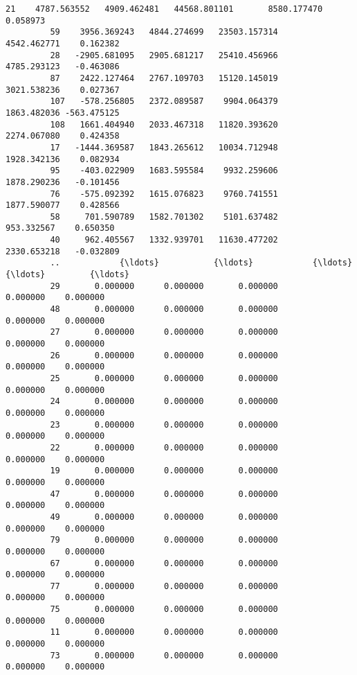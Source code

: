 \documentclass[11pt]{article}
\begin{document}
\begin{Verbatim}[commandchars=\\\{\}]
         21    4787.563552   4909.462481   44568.801101       8580.177470    0.058973   
         59    3956.369243   4844.274699   23503.157314       4542.462771    0.162382   
         28   -2905.681095   2905.681217   25410.456966       4785.293123   -0.463086   
         87    2422.127464   2767.109703   15120.145019       3021.538236    0.027367   
         107   -578.256805   2372.089587    9904.064379       1863.482036 -563.475125   
         108   1661.404940   2033.467318   11820.393620       2274.067080    0.424358   
         17   -1444.369587   1843.265612   10034.712948       1928.342136    0.082934   
         95    -403.022909   1683.595584    9932.259606       1878.290236   -0.101456   
         76    -575.092392   1615.076823    9760.741551       1877.590077    0.428566   
         58     701.590789   1582.701302    5101.637482        953.332567    0.650350   
         40     962.405567   1332.939701   11630.477202       2330.653218   -0.032809   
         ..            {\ldots}           {\ldots}            {\ldots}               {\ldots}         {\ldots}   
         29       0.000000      0.000000       0.000000          0.000000    0.000000   
         48       0.000000      0.000000       0.000000          0.000000    0.000000   
         27       0.000000      0.000000       0.000000          0.000000    0.000000   
         26       0.000000      0.000000       0.000000          0.000000    0.000000   
         25       0.000000      0.000000       0.000000          0.000000    0.000000   
         24       0.000000      0.000000       0.000000          0.000000    0.000000   
         23       0.000000      0.000000       0.000000          0.000000    0.000000   
         22       0.000000      0.000000       0.000000          0.000000    0.000000   
         19       0.000000      0.000000       0.000000          0.000000    0.000000   
         47       0.000000      0.000000       0.000000          0.000000    0.000000   
         49       0.000000      0.000000       0.000000          0.000000    0.000000   
         79       0.000000      0.000000       0.000000          0.000000    0.000000   
         67       0.000000      0.000000       0.000000          0.000000    0.000000   
         77       0.000000      0.000000       0.000000          0.000000    0.000000   
         75       0.000000      0.000000       0.000000          0.000000    0.000000   
         11       0.000000      0.000000       0.000000          0.000000    0.000000   
         73       0.000000      0.000000       0.000000          0.000000    0.000000   

\end{Verbatim}
\end{document}
